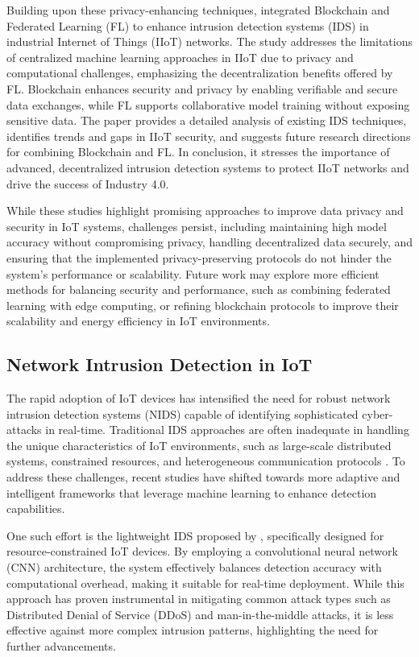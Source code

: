Building upon these privacy-enhancing techniques, \citet{ali2024blockchain} integrated Blockchain and Federated Learning (FL) to enhance intrusion detection systems (IDS) in industrial Internet of Things (IIoT) networks. The study addresses the limitations of centralized machine learning approaches in IIoT due to privacy and computational challenges, emphasizing the decentralization benefits offered by FL. Blockchain enhances security and privacy by enabling verifiable and secure data exchanges, while FL supports collaborative model training without exposing sensitive data. The paper provides a detailed analysis of existing IDS techniques, identifies trends and gaps in IIoT security, and suggests future research directions for combining Blockchain and FL. In conclusion, it stresses the importance of advanced, decentralized intrusion detection systems to protect IIoT networks and drive the success of Industry 4.0.

While these studies highlight promising approaches to improve data privacy and security in IoT systems, challenges persist, including maintaining high model accuracy without compromising privacy, handling decentralized data securely, and ensuring that the implemented privacy-preserving protocols do not hinder the system's performance or scalability. Future work may explore more efficient methods for balancing security and performance, such as combining federated learning with edge computing, or refining blockchain protocols to improve their scalability and energy efficiency in IoT environments.
\subsection{Network Intrusion Detection in IoT}

The rapid adoption of IoT devices has intensified the need for robust network intrusion detection systems (NIDS) capable of identifying sophisticated cyber-attacks in real-time. Traditional IDS approaches are often inadequate in handling the unique characteristics of IoT environments, such as large-scale distributed systems, constrained resources, and heterogeneous communication protocols \cite{lu2021communication, liu2023heterps}. To address these challenges, recent studies have shifted towards more adaptive and intelligent frameworks that leverage machine learning to enhance detection capabilities.

One such effort is the lightweight IDS proposed by \citet{shen2024deep}, specifically designed for resource-constrained IoT devices. By employing a convolutional neural network (CNN) architecture, the system effectively balances detection accuracy with computational overhead, making it suitable for real-time deployment. While this approach has proven instrumental in mitigating common attack types such as Distributed Denial of Service (DDoS) and man-in-the-middle attacks, it is less effective against more complex intrusion patterns, highlighting the need for further advancements.

